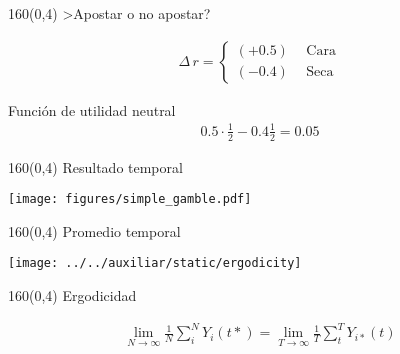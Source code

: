 \documentclass[shownotes,aspectratio=169]{beamer}
\begin{document}
\begin{frame}[plain]
 \begin{textblock}{160}(0,4)
  \centering \Large >Apostar o no apostar?
 \end{textblock}
 \vspace{1cm}
 
 \begin{align*}
 \Delta \,r = 
      \begin{cases*}
       (+0.5) & \ \ \text{Cara} \\
       (-0.4) & \ \ \text{Seca}
    \end{cases*}
 \end{align*}

 \pause
 \vspace{1cm}
 \centering
 
 Función de utilidad neutral
 \begin{align*}
  0.5\cdot \frac{1}{2} - 0.4 \frac{1}{2} = 0.05
 \end{align*} 
 
 
\end{frame}


\begin{frame}[plain]
 \begin{textblock}{160}(0,4)
  \centering \Large Resultado temporal
 \end{textblock}
 

 \centering
\vspace{1cm}
 
\texttt{[image: figures/simple\_gamble.pdf]}

\end{frame}

\begin{frame}[plain]
 \begin{textblock}{160}(0,4)
  \centering \Large Promedio temporal
 \end{textblock}
 \vspace{1cm}
 
 
 \centering
\texttt{[image: ../../auxiliar/static/ergodicity]}

\end{frame}

\begin{frame}[plain]
 \begin{textblock}{160}(0,4)
  \centering \Large Ergodicidad
 \end{textblock}


 \begin{align*}
  \lim_{N\rightarrow \infty} \frac{1}{N} \sum_i^N Y_i(t*) = \lim_{T\rightarrow \infty} \frac{1}{T} \sum_t^T Y_{i*}(t)
 \end{align*}

\end{frame}
\end{document}
